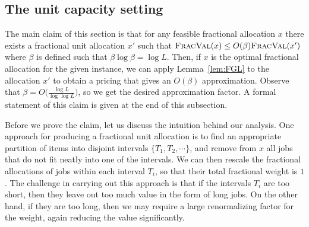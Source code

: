 \subsection{The unit capacity setting}
\label{sec:unit-cap-ub}

% 

The main claim of this section is that for any feasible fractional allocation
$x$ there exists a fractional unit allocation $x'$ such that ${\normalfont\textsc{FracVal}}(x)\le
O(\beta){\normalfont\textsc{FracVal}}(x')$ where $\beta$ is defined such that $\beta\log\beta = \log
L$. Then, if $x$ is the optimal fractional allocation for the given instance,
we can apply Lemma~\ref{lem:FGL} to the allocation $x'$ to obtain a pricing
that gives an $O(\beta)$ approximation. Observe that $\beta=O\big(\frac{\log
L}{\log\log L}\big)$, so we get the desired approximation factor. A formal
statement of this claim is given at the end of this subsection.

Before we prove the claim, let us discuss the intuition behind our analysis.
One approach for producing a fractional unit allocation is to find an
appropriate partition of items into disjoint intervals $\{T_1, T_2, \cdots\}$,
and remove from $x$ all jobs that do not fit neatly into one of the intervals.
We can then rescale the fractional allocations of jobs within each interval
$T_i$, so that their total fractional weight is $1$. The challenge in carrying
out this approach is that if the intervals $T_i$ are too short, then they leave
out too much value in the form of long jobs. On the other hand, if they are too
long, then we may require a large renormalizing factor for the weight, again
reducing the value significantly. 

